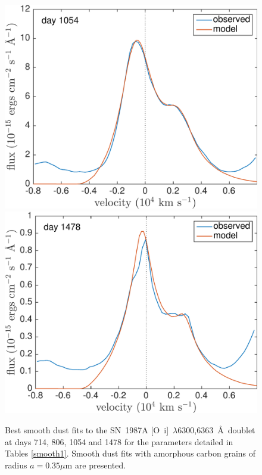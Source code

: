 \begin{figure}
\includegraphics[trim =0 0 0 -20,clip=true,scale=0.4]{chapters/chapter5/images/smooth/best_fit/d1054OI.pdf}
\hspace{1mm}
\includegraphics[trim =25 0 0 -20,clip=true,scale=0.4]{chapters/chapter5/images/smooth/best_fit/d1478OI.pdf}


\caption{Best smooth dust fits to the SN~1987A [O~{\sc i}]~$\lambda$6300,6363~\AA\ doublet at days 714, 806, 1054 and 1478 for the parameters detailed in Tables \ref{smooth1}.  Smooth dust fits with amorphous carbon grains of radius $a=0.35 \mu$m are presented.}
\label{OI_smooth}

\end{figure}

